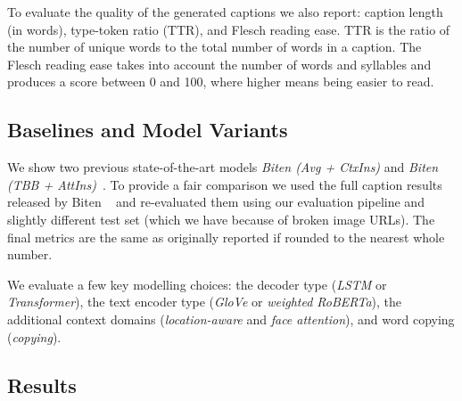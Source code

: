 To evaluate the quality of the generated captions we also report: caption
length (in words), type-token ratio (TTR), and Flesch
reading ease. TTR is the ratio of the number of unique words to the total
number of words in a caption. The Flesch reading ease takes into account the
number of words and syllables and produces a score between 0 and 100, where
higher means being easier to read.

\subsection{Baselines and Model Variants}

We show two previous state-of-the-art
models \textit{Biten (Avg + CtxIns)} and \textit{Biten (TBB +
	AttIns)}~\cite{Biten2019GoodNews}. To provide a fair comparison we used the
full caption results released by Biten \etal~\cite{Biten2019GoodNews} and
re-evaluated them using our evaluation pipeline and slightly different test set
(which we
have because of
broken image URLs). The final metrics are the same as originally reported if
rounded to the nearest
whole number.

We evaluate a few key modelling choices: the decoder type (\textit{LSTM} or
\textit{Transformer}), the text encoder type (\textit{GloVe} or
\textit{weighted RoBERTa}), the additional context domains
(\textit{location-aware} and \textit{face attention}), and word copying
(\textit{copying}). 


\subsection{Results}




